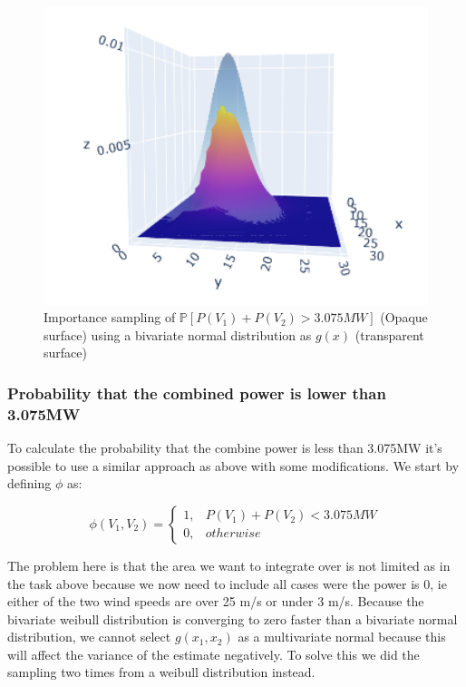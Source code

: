 \documentclass[a4paper]{article}
\begin{document}
\begin{figure}[H]
    \centering
    \includegraphics[width = 1.0\textwidth]{images/probability3D}
    \caption{Importance sampling of $\mathbb{P}[P(V_1) + P(V_2) > 3.075 MW]$ (Opaque surface) using a bivariate normal distribution as $g(x)$ (transparent surface)}
    \label{fig:3Dprob}
\end{figure}

\subsubsection*{Probability that the combined power is lower than 3.075MW}

To calculate the probability that the combine power is less than 3.075MW it's possible to use a similar approach as above with some modifications. We start by defining $\phi$ as:

\begin{equation}
    \phi(V_1, V_2)=\begin{cases}
        1, & P(V_1) + P(V_2) < 3.075MW\\ 
        0, & otherwise 
    \end{cases}
\end{equation}

The problem here is that the area we want to integrate over is not limited as in the task above because we now need to include all cases were the power is 0, ie either of the two wind speeds are over 25 m/s or under 3 m/s. Because the bivariate weibull distribution is converging to zero faster than a bivariate normal distribution, we cannot select $g(x_1, x_2)$ as a multivariate normal because this will affect the variance of the estimate negatively. To solve this we did the sampling two times from a weibull distribution instead. 
\end{document}
